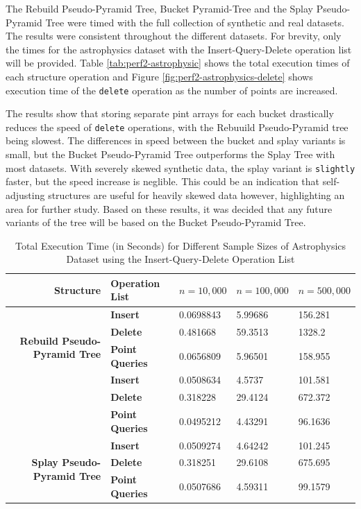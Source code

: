 The Rebuild Pseudo-Pyramid Tree, Bucket Pyramid-Tree and the Splay Pseudo-Pyramid Tree were timed with the full collection of synthetic and real datasets. The results were consistent throughout the different datasets. For brevity, only the times for the astrophysics dataset with the Insert-Query-Delete operation list will be provided. Table \ref{tab:perf2-astrophysic} shows the total execution times of each structure operation and Figure \ref{fig:perf2-astrophysics-delete} shows execution time of the \texttt{delete} operation as the number of points are increased.

The results show that storing separate pint arrays for each bucket drastically reduces the speed of \texttt{delete} operations, with the Rebuuild Pseudo-Pyramid tree being slowest. The differences in speed between the bucket and splay variants is small, but the Bucket Pseudo-Pyramid Tree outperforms the Splay Tree with most datasets. With severely skewed synthetic data, the splay variant is \texttt{slightly} faster, but the speed increase is neglible. This could be an indication that self-adjusting structures are useful for heavily skewed data however, highlighting an area for further study. Based on these results, it was decided that any future variants of the tree will be based on the Bucket Pseudo-Pyramid Tree.

\begin{table}
	\centering
	\begin{tabular}{|r|l|l|l|l|}
		\hline
		\textbf{Structure} & \textbf{Operation List} & $n = 10,000$ & $n = 100,000$ & $n = 500,000$ \\
		\hline
		\multirow{ 4}{*}{\textbf{Rebuild Pseudo-Pyramid Tree}} & \textbf{Insert} & 0.0698843 & 5.99686 & 156.281 \\
		 & \textbf{Delete} & 0.481668 & 59.3513 & 1328.2 \\
		 & \textbf{Point Queries} & 0.0656809 & 5.96501 & 158.955 \\
		\hline
		\multirow{ 4}{*}{\textbf{Bucket Pseudo-Pyramid Tree}} & \textbf{Insert} & 0.0508634 & 4.5737 & 101.581 \\
		 & \textbf{Delete} & 0.318228 & 29.4124 & 672.372 \\
		 & \textbf{Point Queries} & 0.0495212 & 4.43291 & 96.1636 \\
		\hline
		\multirow{ 4}{*}{\textbf{Splay Pseudo-Pyramid Tree}} & \textbf{Insert} & 0.0509274 & 4.64242 & 101.245 \\
		 & \textbf{Delete} & 0.318251 & 29.6108 & 675.695 \\
		 & \textbf{Point Queries} & 0.0507686 & 4.59311 & 99.1579 \\
		\hline
	\end{tabular}
	\caption{Total Execution Time (in Seconds) for Different Sample Sizes of Astrophysics Dataset using the Insert-Query-Delete Operation List}
	\label{tab:perf2-astrophysics}
\end{table}

